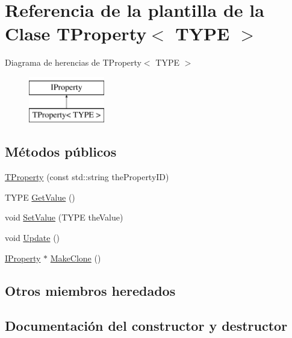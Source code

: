 \hypertarget{classTProperty}{}\section{Referencia de la plantilla de la Clase T\+Property$<$ T\+Y\+P\+E $>$}
\label{classTProperty}
Diagrama de herencias de T\+Property$<$ T\+Y\+P\+E $>$\begin{figure}[H]
\begin{center}
\leavevmode
\includegraphics[height=2.000000cm]{classTProperty}
\end{center}
\end{figure}
\subsection*{Métodos públicos}
\begin{DoxyCompactItemize}
\item 
\hyperlink{classTProperty_a58ede57ac36a9c98bb06ca773f9b62ee}{T\+Property} (const std\+::string the\+Property\+I\+D)
\item 
T\+Y\+P\+E \hyperlink{classTProperty_adceda6e9d1c01f091cec619a48b1822f}{Get\+Value} ()
\item 
void \hyperlink{classTProperty_ad7949c54d792c67cd73b299964699541}{Set\+Value} (T\+Y\+P\+E the\+Value)
\item 
void \hyperlink{classTProperty_ab463fc86cb27252b763b38be21e82c3f}{Update} ()
\item 
\hyperlink{classIProperty}{I\+Property} $\ast$ \hyperlink{classTProperty_a40e392d305cc3886255946359977edcb}{Make\+Clone} ()
\end{DoxyCompactItemize}
\subsection*{Otros miembros heredados}


\subsection{Documentación del constructor y destructor}
\hypertarget{classTProperty_a58ede57ac36a9c98bb06ca773f9b62ee}{}
